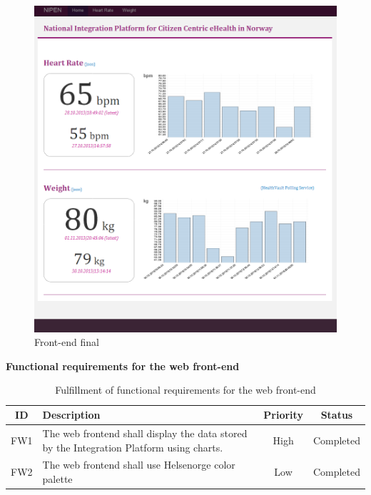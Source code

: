 \begin{figure}[H]
\centering
\includegraphics[scale=0.50]{../Figures/front-endfinal.png}
\caption{Front-end final}
\label{figure:front-endfinal}
\end{figure}

\textbf{Functional requirements for the web front-end}

\begin{table}[H]
\begin{center}
\begin{tabular}{ | c | p{9cm} | c | c |}
  \hline
  ID & Description & Priority & Status\\
  \hline\noalign{\smallskip}\noalign{\smallskip}\hline
  FW1	& The web frontend shall display the data stored by the Integration Platform using charts.	& High & Completed \\
  FW2	& The web frontend shall use Helsenorge color palette                                       & Low & Completed \\
  \hline
\end{tabular}
\end{center}
\caption{Fulfillment of functional requirements for the web front-end}
\label{table:fulfillemntofwebfront-end}
\end{table}

